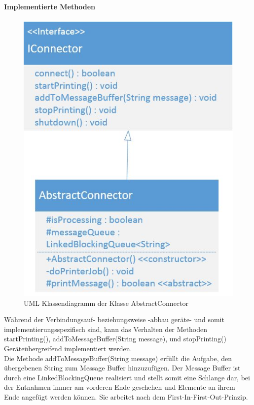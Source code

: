 \paragraph{Implementierte Methoden}
\begin{figure}
	\includegraphics[width=\linewidth]{../images/abstractConnector.JPG}
	\caption{UML Klassendiagramm der Klasse AbstractConnector}
	\label{fig:AbstractConnector}
\end{figure}
Während der Verbindungsauf- beziehungsweise -abbau geräte- und somit implementierungsspezifisch sind, kann das Verhalten der Methoden startPrinting(), addToMessageBuffer(String message),  und stopPrinting() Geräteübergreifend implementiert werden.\\
Die Methode addToMessageBuffer(String message) erfüllt die Aufgabe, den übergebenen String zum Message Buffer hinzuzufügen. Der Message Buffer ist durch eine LinkedBlockingQueue realisiert und stellt somit eine Schlange dar, bei der Entnahmen immer am vorderen Ende geschehen und Elemente an ihrem Ende angefügt werden können. Sie arbeitet nach dem First-In-First-Out-Prinzip.\\
